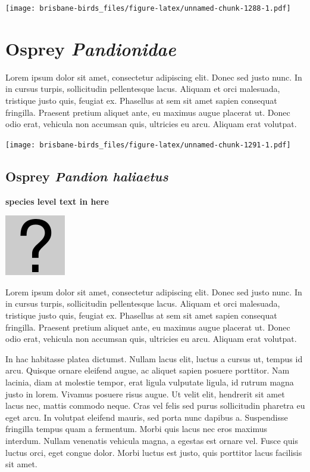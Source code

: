 \documentclass[]{book}
\let\origfigure\figure
\let\endorigfigure\endfigure
\renewenvironment{figure}[1][2] {
  \expandafter\origfigure\expandafter[H]
} {
  \endorigfigure
}
\begin{document}
\begin{figure}
\centering
\texttt{[image: brisbane-birds\_files/figure-latex/unnamed-chunk-1288-1.pdf]}
\caption{\label{fig:unnamed-chunk-1288}insert figure caption}
\end{figure}

\chapter{\texorpdfstring{Osprey
\emph{Pandionidae}}{Osprey Pandionidae}}\label{osprey-pandionidae}

Lorem ipsum dolor sit amet, consectetur adipiscing elit. Donec sed justo
nunc. In in cursus turpis, sollicitudin pellentesque lacus. Aliquam et
orci malesuada, tristique justo quis, feugiat ex. Phasellus at sem sit
amet sapien consequat fringilla. Praesent pretium aliquet ante, eu
maximus augue placerat ut. Donec odio erat, vehicula non accumsan quis,
ultricies eu arcu. Aliquam erat volutpat.

\texttt{[image: brisbane-birds\_files/figure-latex/unnamed-chunk-1291-1.pdf]}

\section{\texorpdfstring{Osprey \emph{Pandion
haliaetus}}{Osprey Pandion haliaetus}}\label{osprey-pandion-haliaetus}

\textbf{species level text in here}

\begin{figure}
\centering
\includegraphics{assets/missing.png}
\caption{No image for species}
\end{figure}

Lorem ipsum dolor sit amet, consectetur adipiscing elit. Donec sed justo
nunc. In in cursus turpis, sollicitudin pellentesque lacus. Aliquam et
orci malesuada, tristique justo quis, feugiat ex. Phasellus at sem sit
amet sapien consequat fringilla. Praesent pretium aliquet ante, eu
maximus augue placerat ut. Donec odio erat, vehicula non accumsan quis,
ultricies eu arcu. Aliquam erat volutpat.

In hac habitasse platea dictumst. Nullam lacus elit, luctus a cursus ut,
tempus id arcu. Quisque ornare eleifend augue, ac aliquet sapien posuere
porttitor. Nam lacinia, diam at molestie tempor, erat ligula vulputate
ligula, id rutrum magna justo in lorem. Vivamus posuere risus augue. Ut
velit elit, hendrerit sit amet lacus nec, mattis commodo neque. Cras vel
felis sed purus sollicitudin pharetra eu eget arcu. In volutpat eleifend
mauris, sed porta nunc dapibus a. Suspendisse fringilla tempus quam a
fermentum. Morbi quis lacus nec eros maximus interdum. Nullam venenatis
vehicula magna, a egestas est ornare vel. Fusce quis luctus orci, eget
congue dolor. Morbi luctus est justo, quis porttitor lacus facilisis sit
amet.
\end{document}
